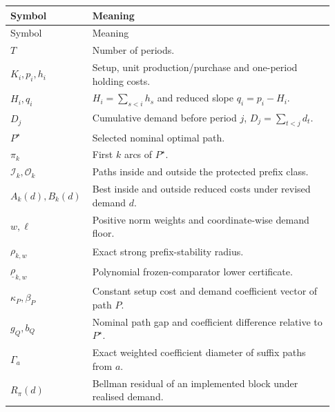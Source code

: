 \documentclass[11pt]{article}
\theoremstyle{definition}
\newcommand{\cI}{\mathcal{I}}
\newcommand{\cO}{\mathcal{O}}
\newcommand{\ellv}{\ell}
\begin{document}
\begin{longtable}{@{}p{0.20\linewidth}p{0.73\linewidth}@{}}
\toprule
Symbol & Meaning \\
\midrule
\endfirsthead
\toprule
Symbol & Meaning \\
\midrule
\endhead
$T$ & Number of periods. \\
$K_i,p_i,h_i$ & Setup, unit production/purchase and one-period holding costs. \\
$H_i,q_i$ & $H_i=\sum_{s<i}h_s$ and reduced slope $q_i=p_i-H_i$. \\
$D_j$ & Cumulative demand before period $j$, $D_j=\sum_{t<j}d_t$. \\
$P^\star$ & Selected nominal optimal path. \\
$\pi_k$ & First $k$ arcs of $P^\star$. \\
$\cI_k,\cO_k$ & Paths inside and outside the protected prefix class. \\
$A_k(d),B_k(d)$ & Best inside and outside reduced costs under revised demand $d$. \\
$w,\ellv$ & Positive norm weights and coordinate-wise demand floor. \\
$\rho_{k,w}$ & Exact strong prefix-stability radius. \\
$\underline\rho_{k,w}$ & Polynomial frozen-comparator lower certificate. \\
$\kappa_P,\beta_P$ & Constant setup cost and demand coefficient vector of path $P$. \\
$g_Q,b_Q$ & Nominal path gap and coefficient difference relative to $P^\star$. \\
$\Gamma_a$ & Exact weighted coefficient diameter of suffix paths from $a$. \\
$R_\pi(d)$ & Bellman residual of an implemented block under realised demand. \\
\bottomrule
\end{longtable}

\printbibliography[title={References}]
\end{document}
